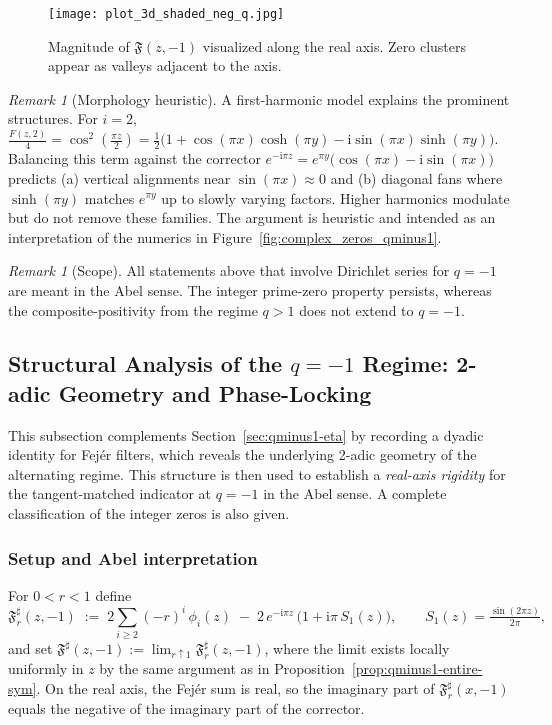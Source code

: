 \documentclass[11pt,a4paper]{amsart}
\newcommand{\ii}{\mathrm{i}}
\newcommand{\Fbase}{\mathfrak F}
\newcommand{\Fsharp}{\Fbase^{\sharp}}
\theoremstyle{plain}
\theoremstyle{definition}
\theoremstyle{remark}
\newtheorem{remark}[theorem]{Remark}
\begin{document}
\begin{figure}[t]
\centering
\texttt{[image: plot\_3d\_shaded\_neg\_q.jpg]}
\caption{Magnitude of $\mathfrak{F}(z,-1)$ visualized along the real axis. Zero clusters appear as valleys adjacent to the axis.}
\label{fig:3d_real_axis_shaded_neg_q}
\end{figure}

\FloatBarrier

\begin{remark}[Morphology heuristic]\label{rem:qminus1-morphology}
A first-harmonic model explains the prominent structures. For $i=2$,
\(\tfrac{F(z,2)}{4}=\cos^2(\tfrac{\pi z}{2})
=\tfrac12\bigl(1+\cos(\pi x)\cosh(\pi y)-\ii \sin(\pi x)\sinh(\pi y)\bigr)\).
Balancing this term against the corrector $e^{-\ii\pi z}=e^{\pi y}\big(\cos(\pi x)-\ii\sin(\pi x)\big)$ predicts (a) vertical alignments near $\sin(\pi x)\approx0$ and (b) diagonal fans where $\sinh(\pi y)$ matches $e^{\pi y}$ up to slowly varying factors. Higher harmonics modulate but do not remove these families. The argument is heuristic and intended as an interpretation of the numerics in Figure~\ref{fig:complex_zeros_qminus1}.
\end{remark}

\begin{remark}[Scope]
All statements above that involve Dirichlet series for $q=-1$ are meant in the Abel sense. The integer prime-zero property persists, whereas the composite-positivity from the regime $q>1$ does not extend to $q=-1$.
\end{remark}


\subsection{Structural Analysis of the \texorpdfstring{$q=-1$}{q=-1} Regime: 2-adic Geometry and Phase-Locking}
\label{subsec:struct-qminus1}

This subsection complements Section~\ref{sec:qminus1-eta} by recording a dyadic identity for Fej\'er filters, which reveals the underlying 2-adic geometry of the alternating regime. This structure is then used to establish a \emph{real-axis rigidity} for the tangent-matched indicator at $q=-1$ in the Abel sense. A complete classification of the integer zeros is also given.

\subsubsection*{Setup and Abel interpretation}
For $0<r<1$ define
\[
\Fsharp_r(z,-1)\;:=\;2\sum_{i\ge2}(-r)^i\,\phi_i(z)\;-\;2\,e^{-\ii\pi z}\,\bigl(1+\ii\pi\,S_1(z)\bigr),
\qquad
S_1(z)=\tfrac{\sin(2\pi z)}{2\pi},
\]
and set $\Fsharp(z,-1):=\lim_{r\uparrow1}\Fsharp_r(z,-1)$, where the limit exists locally uniformly in $z$ by the same argument as in Proposition~\ref{prop:qminus1-entire-sym}. On the real axis, the Fej\'er sum is real, so the imaginary part of $\Fsharp_r(x,-1)$ equals the negative of the imaginary part of the corrector.
\end{document}
